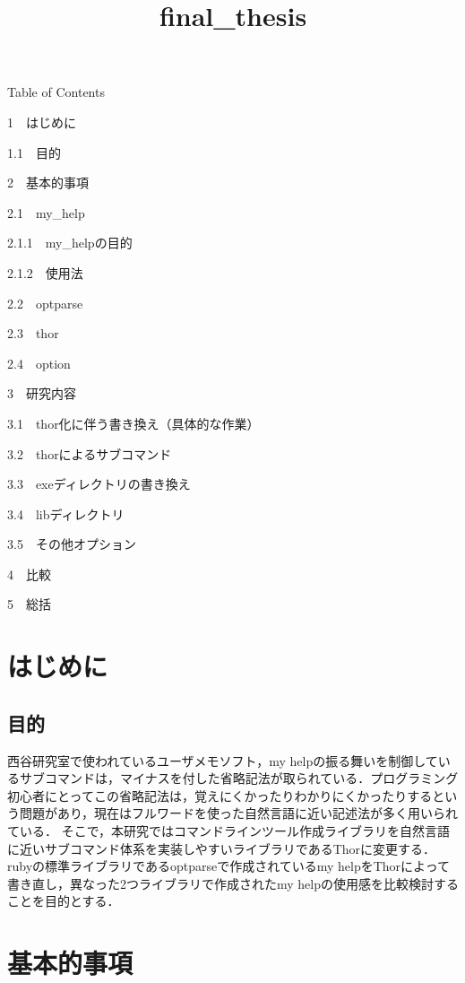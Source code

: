 \documentclass[11pt,dvipdfmx]{jsarticle}
\title{final\_thesis}
\begin{document}
    
    
    \maketitle
    
    

    
    Table of Contents{}

{{1~~}はじめに}

{{1.1~~}目的}

{{2~~}基本的事項}

{{2.1~~}my\_help}

{{2.1.1~~}my\_helpの目的}

{{2.1.2~~}使用法}

{{2.2~~}optparse}

{{2.3~~}thor}

{{2.4~~}option}

{{3~~}研究内容}

{{3.1~~}thor化に伴う書き換え（具体的な作業）}

{{3.2~~}thorによるサブコマンド}

{{3.3~~}exeディレクトリの書き換え}

{{3.4~~}libディレクトリ}

{{3.5~~}その他オプション}

{{4~~}比較}

{{5~~}総括}

    \section{はじめに}\label{ux306fux3058ux3081ux306b}

\subsection{目的}\label{ux76eeux7684}

西谷研究室で使われているユーザメモソフト，my
helpの振る舞いを制御しているサブコマンドは，マイナスを付した省略記法が取られている．プログラミング初心者にとってこの省略記法は，覚えにくかったりわかりにくかったりするという問題があり，現在はフルワードを使った自然言語に近い記述法が多く用いられている．
そこで，本研究ではコマンドラインツール作成ライブラリを自然言語に近いサブコマンド体系を実装しやすいライブラリであるThorに変更する．rubyの標準ライブラリであるoptparseで作成されているmy
helpをThorによって書き直し，異なった2つライブラリで作成されたmy
helpの使用感を比較検討することを目的とする．

    \section{基本的事項}\label{ux57faux672cux7684ux4e8bux9805}
\end{document}
